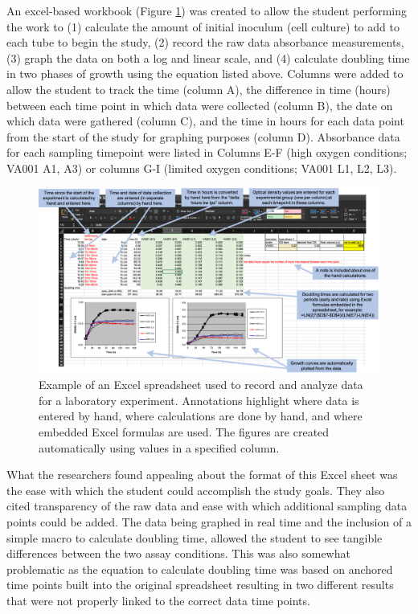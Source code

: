 \documentclass[]{tufte-book}
\begin{document}
An excel-based workbook (Figure \ref{fig:growthexcel}) was created to allow the
student performing the work to (1) calculate the amount of initial inoculum
(cell culture) to add to each tube to begin the study, (2) record the raw data
absorbance measurements, (3) graph the data on both a log and linear scale, and
(4) calculate doubling time in two phases of growth using the equation listed
above. Columns were added to allow the student to track the time (column A), the
difference in time (hours) between each time point in which data were collected
(column B), the date on which data were gathered (column C), and the time in
hours for each data point from the start of the study for graphing purposes
(column D). Absorbance data for each sampling timepoint were listed in Columns
E-F (high oxygen conditions; VA001 A1, A3) or columns G-I (limited oxygen
conditions; VA001 L1, L2, L3).

\begin{figure}
\includegraphics[width=\textwidth]{figures/growth_curve_example} \caption[Example of an Excel spreadsheet used to record and analyze data for a laboratory experiment]{Example of an Excel spreadsheet used to record and analyze data for a laboratory experiment. Annotations highlight where data is entered by hand, where calculations are done by hand, and where embedded Excel formulas are used. The figures are created automatically using values in a specified column.}\label{fig:growthexcel}
\end{figure}

What the researchers found appealing about the format of this Excel sheet was
the ease with which the student could accomplish the study goals. They also
cited transparency of the raw data and ease with which additional sampling data
points could be added. The data being graphed in real time and the inclusion of
a simple macro to calculate doubling time, allowed the student to see tangible
differences between the two assay conditions. This was also somewhat problematic
as the equation to calculate doubling time was based on anchored time points
built into the original spreadsheet resulting in two different results that were
not properly linked to the correct data time points.
\end{document}
